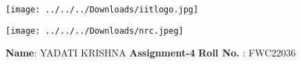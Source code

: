 \documentclass[10pt,a4paper]{report}
\begin{document}
\begin{figure*}[!tbp]
  \centering
  \begin{minipage}[b]{0.4\textwidth}
\texttt{[image: ../../../Downloads/iitlogo.jpg]} 
  \end{minipage}
  \hfill
  \vspace{5mm}\begin{minipage}[b]{0.4\textwidth}
\raggedleft  \texttt{[image: ../../../Downloads/nrc.jpeg]} 

  \end{minipage}\vspace{0.2cm}
\end{figure*}
\raggedright \textbf{Name}:\hspace{1mm} YADATI KRISHNA\hspace{3cm} \Large \textbf{Assignment-4}\hspace{2.5cm} %
\normalsize \textbf{Roll No.} :\hspace{1mm} FWC22036\vspace{1cm}
\end{document}
